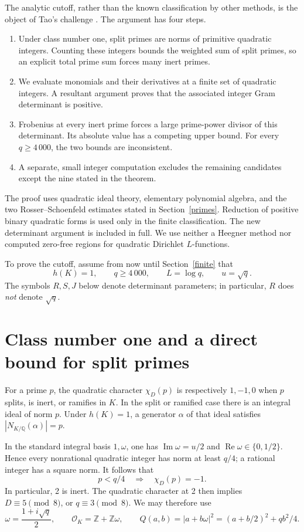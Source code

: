 \documentclass[11pt]{article}
\newcommand{\Z}{\mathbb Z}
\newcommand{\Q}{\mathbb Q}
\newcommand{\OK}{\mathcal O_K}
\begin{document}
The analytic cutoff, rather than the known classification by other
methods, is the object of Tao's challenge \cite{tao}.
The argument has four steps.
\begin{enumerate}
\item Under class number one, split primes are norms of primitive
quadratic integers. Counting these integers bounds the weighted sum
of split primes, so an explicit total prime sum forces many inert primes.
\item We evaluate monomials and their derivatives at a finite set of
quadratic integers. A resultant argument proves that the associated
integer Gram determinant is positive.
\item Frobenius at every inert prime forces a large prime-power divisor
of this determinant. Its absolute value has a competing upper bound.
For every \(q\ge4\,000\), the two bounds are inconsistent.
\item A separate, small integer computation excludes the remaining
candidates except the nine stated in the theorem.
\end{enumerate}

The proof uses quadratic ideal theory, elementary polynomial algebra,
and the two Rosser--Schoenfeld estimates stated in
Section~\ref{primes}. Reduction of positive binary quadratic forms is
used only in the finite classification. The new determinant argument is
included in full. We use neither a Heegner method nor computed
zero-free regions for quadratic Dirichlet \(L\)-functions.

To prove the cutoff, assume from now until Section~\ref{finite} that
\[
 h(K)=1,\qquad q\ge4\,000,\qquad L=\log q,\qquad u=\sqrt q.
\]
The symbols \(R,S,J\) below denote determinant parameters;
in particular, \(R\) does \emph{not} denote \(\sqrt q\).

\section{Class number one and a direct bound for split primes}

For a prime \(p\), the quadratic character \(\chi_D(p)\) is respectively
\(1,-1,0\) when \(p\) splits, is inert, or ramifies in \(K\).
In the split or ramified case there is an integral ideal of norm \(p\).
Under \(h(K)=1\), a generator \(\alpha\) of that ideal satisfies
\(|N_{K/\Q}(\alpha)|=p\).

In the standard integral basis \(1,\omega\), one has
\(\operatorname{Im}\omega=u/2\) and
\(\operatorname{Re}\omega\in\{0,1/2\}\). Hence every nonrational
quadratic integer has norm at least \(q/4\); a rational integer has a
square norm. It follows that
\begin{equation}\label{small-inert}
 p<q/4\quad\Longrightarrow\quad\chi_D(p)=-1.
\end{equation}
In particular, 2 is inert. The quadratic character at 2 then implies
\(D\equiv5\pmod8\), or \(q\equiv3\pmod8\). We may therefore use
\[
 \omega=\frac{1+i\sqrt q}{2},\qquad
 \OK=\Z+\Z\omega,\qquad
 Q(a,b)=|a+b\omega|^2=(a+b/2)^2+qb^2/4.
\]
\end{document}

